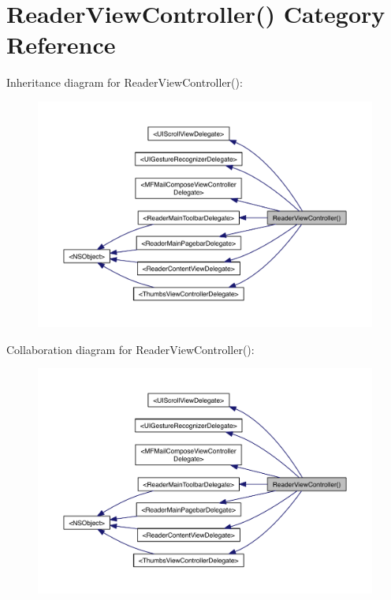 \hypertarget{category_reader_view_controller_07_08}{\section{Reader\-View\-Controller() Category Reference}
\label{db/d1e/category_reader_view_controller_07_08}
}


Inheritance diagram for Reader\-View\-Controller()\-:
\nopagebreak
\begin{figure}[H]
\begin{center}
\leavevmode
\includegraphics[width=350pt]{da/d31/category_reader_view_controller_07_08__inherit__graph}
\end{center}
\end{figure}


Collaboration diagram for Reader\-View\-Controller()\-:
\nopagebreak
\begin{figure}[H]
\begin{center}
\leavevmode
\includegraphics[width=350pt]{dd/d3d/category_reader_view_controller_07_08__coll__graph}
\end{center}
\end{figure}
